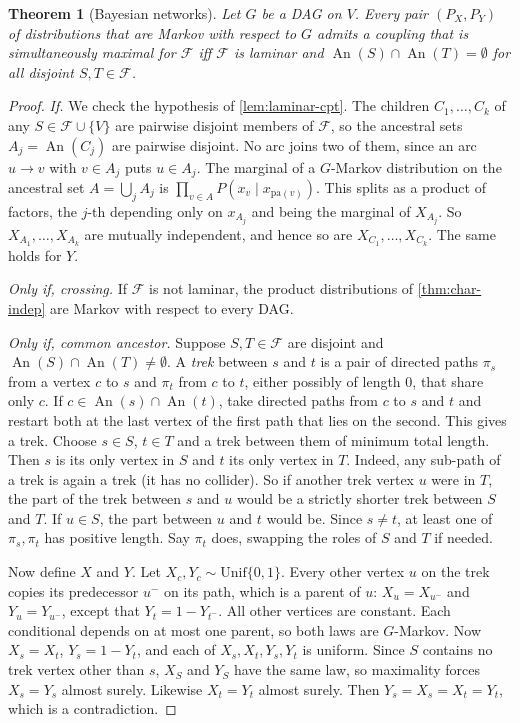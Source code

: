 \documentclass[11pt]{article}
\newtheorem{theorem}{Theorem}[section]
\theoremstyle{definition}
\newcommand{\An}{\operatorname{An}}
\newcommand{\Var}{V}
\newcommand{\F}{\mathcal{F}}
\begin{document}
\begin{theorem}[Bayesian networks]\label{thm:char-bn}
Let $G$ be a DAG on $\Var$. Every pair $(P_X,P_Y)$ of distributions that are
Markov with respect to $G$ admits a coupling that is simultaneously maximal for
$\F$ iff $\F$ is laminar and $\An(S)\cap\An(T)=\emptyset$ for all disjoint
$S,T\in\F$.
\end{theorem}
\begin{proof}
\emph{If.} We check the hypothesis of \cref{lem:laminar-cpt}. The children
$C_1,\dots,C_k$ of any $S\in\F\cup\{\Var\}$ are pairwise disjoint members of
$\F$, so the ancestral sets $A_j=\An(C_j)$ are pairwise disjoint. No arc joins
two of them, since an arc $u\to v$ with $v\in A_j$ puts $u\in A_j$. The
marginal of a $G$-Markov distribution on the ancestral set $A=\bigcup_jA_j$ is
$\prod_{v\in A}P(x_v\mid x_{\mathrm{pa}(v)})$. This splits as a product of
factors, the $j$-th depending only on $x_{A_j}$ and being the marginal of
$X_{A_j}$. So $X_{A_1},\dots,X_{A_k}$ are mutually independent, and hence so
are $X_{C_1},\dots,X_{C_k}$. The same holds for $Y$.

\emph{Only if, crossing.} If $\F$ is not laminar, the product distributions of
\cref{thm:char-indep} are Markov with respect to every DAG.

\emph{Only if, common ancestor.} Suppose $S,T\in\F$ are disjoint and
$\An(S)\cap\An(T)\ne\emptyset$. A \emph{trek} between $s$ and $t$ is a pair of
directed paths $\pi_s$ from a vertex $c$ to $s$ and $\pi_t$ from $c$ to $t$,
either possibly of length $0$, that share only $c$. If $c\in\An(s)\cap\An(t)$,
take directed paths from $c$ to $s$ and $t$ and restart both at the last vertex
of the first path that lies on the second. This gives a trek. Choose $s\in S$,
$t\in T$ and a trek between them of minimum total length. Then $s$ is its only
vertex in $S$ and $t$ its only vertex in $T$. Indeed, any sub-path of a trek is again a trek (it has no collider). So if
another trek vertex $u$ were in $T$, the part of the trek between $s$ and $u$
would be a strictly shorter trek between $S$ and $T$. If $u\in S$, the part
between $u$ and $t$ would be. Since $s\neq t$, at least one of $\pi_s,\pi_t$ has positive length. Say
$\pi_t$ does, swapping the roles of $S$ and $T$ if needed.

Now define $X$ and $Y$. Let $X_c,Y_c\sim\mathrm{Unif}\{0,1\}$. Every other
vertex $u$ on the trek copies its predecessor $u^-$ on its path, which is a
parent of $u$: $X_u=X_{u^-}$ and $Y_u=Y_{u^-}$, except that $Y_t=1-Y_{t^-}$.
All other vertices are constant. Each conditional depends on at most one
parent, so both laws are $G$-Markov. Now $X_s=X_t$, $Y_s=1-Y_t$, and each of
$X_s,X_t,Y_s,Y_t$ is uniform. Since $S$ contains no trek vertex other than
$s$, $X_S$ and $Y_S$ have the same law, so maximality forces $X_s=Y_s$ almost
surely. Likewise $X_t=Y_t$ almost surely. Then
$Y_s=X_s=X_t=Y_t$, which is a contradiction.
\end{proof}
\end{document}
